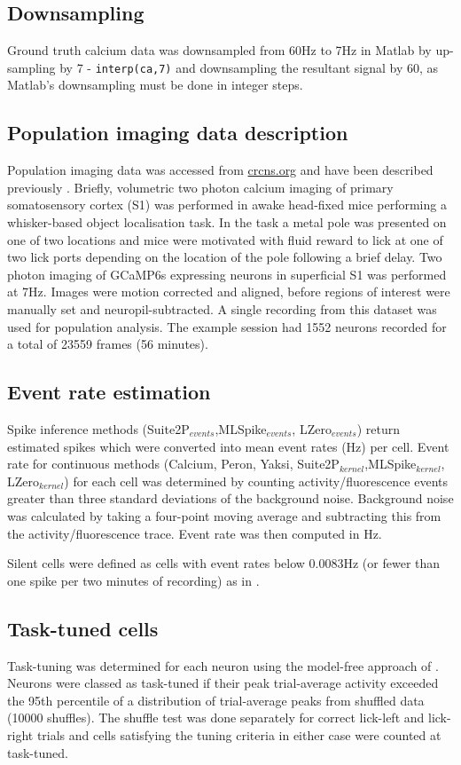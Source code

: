\documentclass[a4paper,10pt,twocolumn]{article}
\begin{document}
\subsection*{Downsampling}
Ground truth calcium data was downsampled from 60Hz to 7Hz in Matlab by up-sampling by 7 - {\tt{interp(ca,7)}} and downsampling the resultant signal by 60, as Matlab's downsampling must be done in integer steps.

\subsection*{Population imaging data description}
Population imaging data was accessed from \href{https://crcns.org/data-sets/ssc/ssc-2}{crcns.org} and have been described previously \citep{Peron2015-kd}. Briefly, volumetric two photon calcium imaging of primary somatosensory cortex (S1) was performed in awake head-fixed mice performing a whisker-based object localisation task. In the task a metal pole was presented on one of two locations and mice were motivated with fluid reward to lick at one of two lick ports depending on the location of the pole following a brief delay. Two photon imaging of GCaMP6s expressing neurons in superficial S1 was performed at 7Hz. Images were motion corrected and aligned, before regions of interest were manually set and neuropil-subtracted. A single recording from this dataset was used for population analysis. The example session had 1552 neurons recorded for a total of 23559 frames (56 minutes).

\subsection{Event rate estimation}
Spike inference methods (Suite2P$_{events}$,MLSpike$_{events}$, LZero$_{events}$) return estimated spikes which were converted into mean event rates (Hz) per cell. Event rate for continuous methods (Calcium, Peron, Yaksi, Suite2P$_{kernel}$,MLSpike$_{kernel}$, LZero$_{kernel}$) for each cell was determined by counting activity/fluorescence events greater than three standard deviations of the background noise. Background noise was calculated by taking a four-point moving average and subtracting this from the activity/fluorescence trace. Event rate was then computed in Hz.

Silent cells were defined as cells with event rates below 0.0083Hz (or fewer than one spike per two minutes of recording) as in \citep{OConnor2010-hd}.

\subsection{Task-tuned cells}
Task-tuning was determined for each neuron using the model-free approach of \cite{Peron2015-kd}. Neurons were classed as task-tuned if their peak trial-average activity exceeded the 95th percentile of a distribution of trial-average peaks from shuffled data (10000 shuffles). The shuffle test was done separately for correct lick-left and lick-right trials and cells satisfying the tuning criteria in either case were counted at task-tuned.
\end{document}
